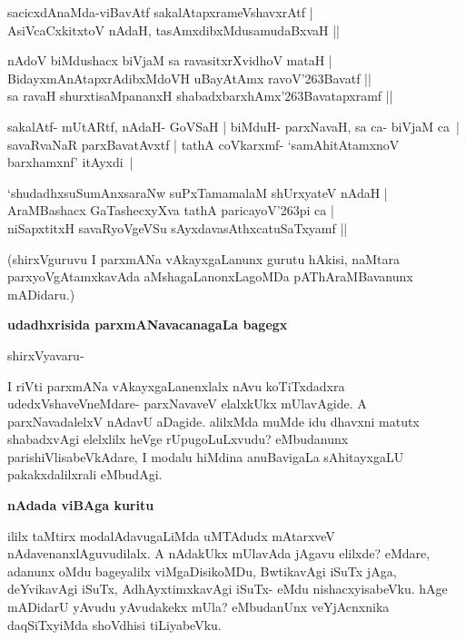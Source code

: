 \begin{itemize}
{\bf 
\item[1.] sacicxdAnaMda-viBavAtf sakalAtapxrameVshavxrAtf |\\\label{157d}
AsiVcaCxkitxtoV nAdaH, tasAmxdibxMdusamudaBxvaH ||
\item[2.] nAdoV biMdushacx biVjaM sa ravasitxrXvidhoV mataH |\\
BidayxmAnAtapxrAdibxMdoVH uBayAtAmx ravoV\char'263Bavatf ||\\
sa ravaH shurxtisaMpananxH shabadxbarxhAmx\char'263Bavatapxramf ||}
\end{itemize}

\begin{artha}
sakalAtf- mUtARtf, nAdaH- GoVSaH | biMduH- parxNavaH, sa ca- biVjaM ca~| savaRvaNaR parxBavatAvxtf | tathA coVkarxmf- `samAhitAtamxnoV barxhamxnf' itAyxdi~|
\end{artha}

\begin{shloka}
`shudadhxsuSumAnxsaraNw suPxTamamalaM shUrxyateV nAdaH |\\\label{157e}
AraMBashacx GaTashecxyXva tathA paricayoV\char'263pi ca |\\\label{157f}
niSapxtitxH savaRyoVgeVSu sAyxdavasAthxcatuSaTxyamf ||
\end{shloka}

\noindent
(shirxVguruvu I parxmANa vAkayxgaLanunx gurutu hAkisi, naMtara parxyoVgAtamxkavAda aMshagaLanonxLagoMDa pAThAraMBavanunx mADidaru.)

{\bigskip
\noindent
{\large\bf udadhxrisida parxmANavacanagaLa bagegx}}\label{page158}
\medskip

\noindent
shirxVyavaru- 

I riVti parxmANa vAkayxgaLanenxlalx nAvu koTiTxdadxra udedxVshaveVneMdare- parxNavaveV elalxkUkx mUlavAgide. A parxNavadalelxV nAdavU aDagide. alilxMda muMde idu dhavxni matutx shabadxvAgi elelxlilx heVge rUpugoLuLxvudu? eMbudanunx parishiVlisabeVkAdare, I modalu hiMdina anuBavigaLa sAhitayxgaLU pakakxdalilxrali eMbudAgi.

{\bigskip
\noindent
{\large\bf nAdada viBAga kuritu}}\label{page158a}
\medskip

\noindent
ililx taMtirx modalAdavugaLiMda uMTAdudx mAtarxveV nAdavenanxlAguvudilalx. A nAdakUkx mUlavAda jAgavu elilxde? eMdare, adanunx oMdu bageyalilx viMgaDisikoMDu, BwtikavAgi iSuTx jAga, deYvikavAgi iSuTx, AdhAyxtimxkavAgi iSuTx- eMdu nishacxyisabeVku. hAge mADidarU yAvudu yAvudakekx mUla? eMbudanUnx veYjAcnxnika daqSiTxyiMda shoVdhisi tiLiyabeVku.

